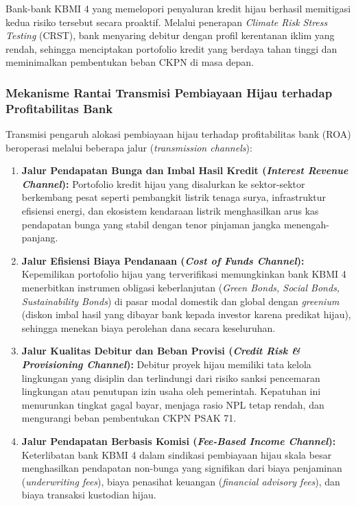 \documentclass[12pt,a4paper]{article}
\numberwithin{equation}{section}
\begin{document}
\noindent
Bank-bank KBMI 4 yang memelopori penyaluran kredit hijau berhasil memitigasi kedua risiko tersebut secara proaktif. Melalui penerapan \emph{Climate Risk Stress Testing} (CRST), bank menyaring debitur dengan profil kerentanan iklim yang rendah, sehingga menciptakan portofolio kredit yang berdaya tahan tinggi dan meminimalkan pembentukan beban CKPN di masa depan.

\subsubsection{Mekanisme Rantai Transmisi Pembiayaan Hijau terhadap Profitabilitas Bank}
\noindent
Transmisi pengaruh alokasi pembiayaan hijau terhadap profitabilitas bank (ROA) beroperasi melalui beberapa jalur (\emph{transmission channels}):
\begin{enumerate}
  \item \textbf{Jalur Pendapatan Bunga dan Imbal Hasil Kredit (\emph{Interest Revenue Channel}):} Portofolio kredit hijau yang disalurkan ke sektor-sektor berkembang pesat seperti pembangkit listrik tenaga surya, infrastruktur efisiensi energi, dan ekosistem kendaraan listrik menghasilkan arus kas pendapatan bunga yang stabil dengan tenor pinjaman jangka menengah-panjang.
  \item \textbf{Jalur Efisiensi Biaya Pendanaan (\emph{Cost of Funds Channel}):} Kepemilikan portofolio hijau yang terverifikasi memungkinkan bank KBMI 4 menerbitkan instrumen obligasi keberlanjutan (\emph{Green Bonds, Social Bonds, Sustainability Bonds}) di pasar modal domestik dan global dengan \emph{greenium} (diskon imbal hasil yang dibayar bank kepada investor karena predikat hijau), sehingga menekan biaya perolehan dana secara keseluruhan.
  \item \textbf{Jalur Kualitas Debitur dan Beban Provisi (\emph{Credit Risk \& Provisioning Channel}):} Debitur proyek hijau memiliki tata kelola lingkungan yang disiplin dan terlindungi dari risiko sanksi pencemaran lingkungan atau penutupan izin usaha oleh pemerintah. Kepatuhan ini menurunkan tingkat gagal bayar, menjaga rasio NPL tetap rendah, dan mengurangi beban pembentukan CKPN PSAK 71.
  \item \textbf{Jalur Pendapatan Berbasis Komisi (\emph{Fee-Based Income Channel}):} Keterlibatan bank KBMI 4 dalam sindikasi pembiayaan hijau skala besar menghasilkan pendapatan non-bunga yang signifikan dari biaya penjaminan (\emph{underwriting fees}), biaya penasihat keuangan (\emph{financial advisory fees}), dan biaya transaksi kustodian hijau.
\end{enumerate}
\end{document}
